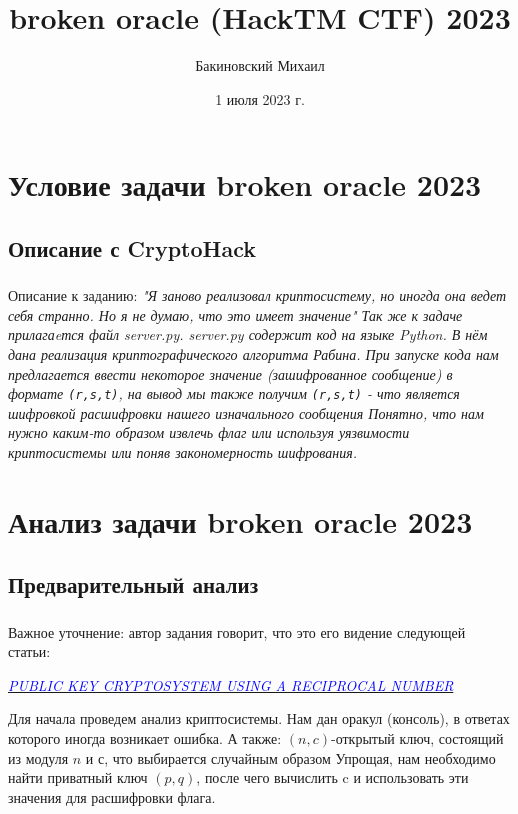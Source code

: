 \documentclass[t]{beamer}
\title{broken oracle (HackTM CTF) 2023}
\author{Бакиновский Михаил}
\date{1 июля 2023 г.}
\institute[БФУ им. Иммануила Канта]{БФУ им. Иммануила Канта\\ ОНК «Институт высоких технологий» \\ Компьютерная безопасность, 3 курс}
\begin{document}
\frame[plain]{\titlepage}	%

\section{Условие задачи broken oracle 2023}
\subsection{Описание с CryptoHack}
\begin{frame}
	\frametitle{\insertsection}
	\framesubtitle{\insertsubsection}
        Описание к заданию: \slshape"Я заново реализовал криптосистему, но иногда она ведет себя странно. Но я не думаю, что это имеет значение"\upshape\newline
        Так же к задаче прилагаeтся файл \slshape server.py.  \upshape \newline server.py содержит код на языке Python. В нём дана реализация криптографического алгоритма Рабина. При запуске кода нам предлагается ввести некоторое значение (зашифрованное сообщение) в формате \texttt{(r,s,t)}, на вывод мы также получим \texttt{(r,s,t)} - что является шифровкой расшифровки нашего изначального сообщения\newline
        Понятно, что нам нужно каким-то образом извлечь флаг или используя уязвимости криптосистемы или поняв закономерность шифрования.

\end{frame}

\section{Анализ задачи broken oracle 2023}
\subsection{Предварительный анализ}
\begin{frame}
	\frametitle{\insertsection}
	\framesubtitle{\insertsubsection}
        Важное уточнение: автор задания говорит, что это его видение следующей статьи:
        \begin{center} \href{https://www.cs.umd.edu/~gasarch/TOPICS/miscrypto/rabinwithrecip.pdf}{\textit{\textcolor{blue}{\fontsize{7pt}{1}\selectfont PUBLIC KEY CRYPTOSYSTEM USING A RECIPROCAL NUMBER}} }
        \end{center}
        Для начала проведем анализ криптосистемы.
        Нам дан оракул (консоль), в ответах которого иногда возникает ошибка. А также:\newline
        ${(n,c)}$-открытый ключ, состоящий из модуля ${n}$ и ${с}$, что выбирается случайным образом \newline
        Упрощая, нам необходимо найти приватный ключ ${(p,q)}$, после чего вычислить c и использовать эти значения для расшифровки флага.

\end{frame}
\end{document}
